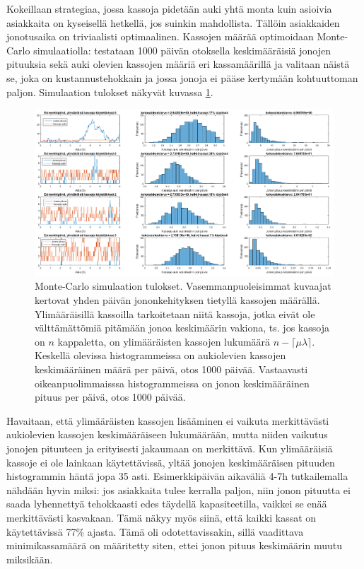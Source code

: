\documentclass{article}     %
\begin{document}
Kokeillaan strategiaa, jossa kassoja pidetään auki yhtä monta kuin asioivia asiakkaita on kyseisellä hetkellä, jos suinkin mahdollista. Tällöin asiakkaiden jonotusaika on triviaalisti optimaalinen. Kassojen määrää optimoidaan Monte-Carlo simulaatiolla: testataan 1000 päivän otoksella keskimääräisiä jonojen pituuksia sekä auki olevien kassojen määriä eri kassamäärillä ja valitaan näistä se, joka on kustannustehokkain ja jossa jonoja ei pääse kertymään kohtuuttoman paljon. Simulaation tulokset näkyvät kuvassa \ref{fig:montecarlo}.

\begin{figure}
\centering
\includegraphics[width = \textwidth]{simulaatiokuvat}
\caption{Monte-Carlo simulaation tulokset. Vasemmanpuoleisimmat kuvaajat kertovat yhden päivän jononkehityksen tietyllä kassojen määrällä. Ylimääräisillä kassoilla tarkoitetaan niitä kassoja, jotka eivät ole välttämättömiä pitämään jonoa keskimäärin vakiona, ts. jos kassoja on $n$ kappaletta, on ylimääräisten kassojen lukumäärä $n - \lceil \mu\lambda \rceil$. Keskellä olevissa histogrammeissa on aukiolevien kassojen keskimääräinen määrä per päivä, otos 1000 päivää. Vastaavasti oikeanpuolimmaisssa histogrammeissa on jonon keskimääräinen pituus per päivä, otos 1000 päivää.}
\label{fig:montecarlo}
\end{figure}

Havaitaan, että ylimääräisten kassojen lisääminen ei vaikuta merkittävästi aukiolevien kassojen keskimääräiseen lukumäärään, mutta niiden vaikutus jonojen pituuteen ja erityisesti jakaumaan on merkittävä. Kun ylimääräisiä kassoje ei ole lainkaan käytettävissä, yltää jonojen keskimääräisen pituuden histogrammin häntä jopa 35 asti. Esimerkkipäivän aikaväliä 4-7h tutkailemalla nähdään hyvin miksi: jos asiakkaita tulee kerralla paljon, niin jonon pituutta ei saada lyhennettyä tehokkaasti edes täydellä kapasiteetilla, vaikkei se enää merkittävästi kasvakaan. Tämä näkyy myös siinä, että kaikki kassat on käytettävissä 77\% ajasta. Tämä oli odotettavissakin, sillä vaadittava minimikassamäärä on määritetty siten, ettei jonon pituus keskimäärin muutu miksikään.
\end{document}

